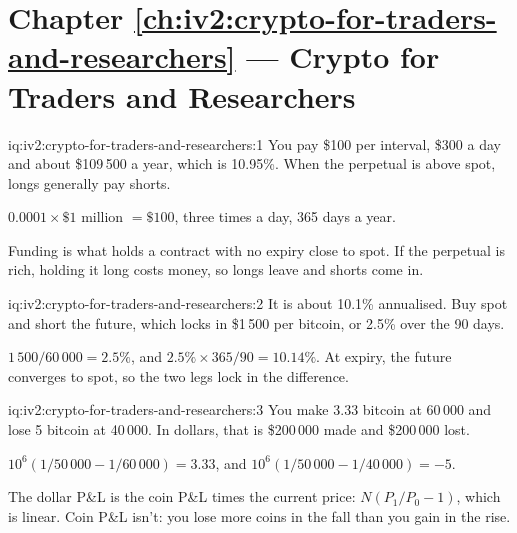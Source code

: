 \section*{Chapter \ref{ch:iv2:crypto-for-traders-and-researchers} --- Crypto for Traders and Researchers}

\begin{solution}{iq:iv2:crypto-for-traders-and-researchers:1}
You pay \$100 per interval, \$300 a day and about \$109\,500 a year, which is 10.95\%. When the perpetual is above spot, longs generally pay shorts.

$0.0001 \times \$1$ million $= \$100$, three times a day, 365 days a year.

Funding is what holds a contract with no expiry close to spot. If the perpetual is rich, holding it long costs money, so longs leave and shorts come in.

\end{solution}

\begin{solution}{iq:iv2:crypto-for-traders-and-researchers:2}
It is about 10.1\% annualised. Buy spot and short the future, which locks in \$1\,500 per bitcoin, or 2.5\% over the 90 days.

$1\,500/60\,000 = 2.5\%$, and $2.5\% \times 365/90 = 10.14\%$. At expiry, the future converges to spot, so the two legs lock in the difference.

\end{solution}

\begin{solution}{iq:iv2:crypto-for-traders-and-researchers:3}
You make 3.33 bitcoin at 60\,000 and lose 5 bitcoin at 40\,000. In dollars, that is \$200\,000 made and \$200\,000 lost.

$10^6(1/50\,000 - 1/60\,000) = 3.33$, and $10^6(1/50\,000 - 1/40\,000) = -5$.

The dollar P\&L is the coin P\&L times the current price: $N(P_1/P_0 - 1)$, which is linear. Coin P\&L isn't: you lose more coins in the fall than you gain in the rise.

\end{solution}

